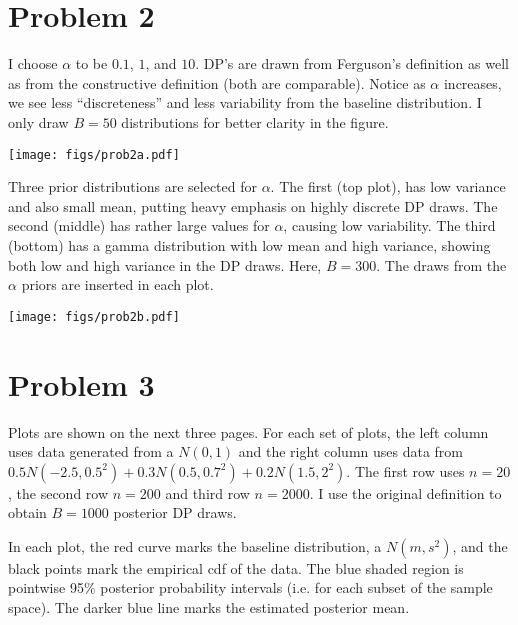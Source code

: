 \documentclass[12pt]{article}
\begin{document}
\newpage

\section*{Problem 2}

\noindent I choose $\alpha$ to be $0.1$, $1$, and $10$. DP's are drawn from Ferguson's definition as well as from the constructive definition (both are comparable). Notice as $\alpha$ increases, we see less ``discreteness'' and less variability from the baseline distribution. I only draw $B=50$ distributions for better clarity in the figure.

\begin{center}
\texttt{[image: figs/prob2a.pdf]}
\end{center}

\noindent Three prior distributions are selected for $\alpha$. The first (top plot), has low variance and also small mean, putting heavy emphasis on highly discrete DP draws. The second (middle) has rather large values for $\alpha$, causing low variability. The third (bottom) has a gamma distribution with low mean and high variance, showing both low and high variance in the DP draws. Here, $B=300$. The draws from the $\alpha$ priors are inserted in each plot.

\begin{center}
\texttt{[image: figs/prob2b.pdf]}
\end{center}

\newpage

\section*{Problem 3}

\noindent Plots are shown on the next three pages. For each set of plots, the left column uses data generated from a $N(0, 1)$ and the right column uses data from $0.5N(-2.5, 0.5^2) + 0.3N(0.5, 0.7^2) + 0.2N(1.5, 2^2)$. The first row uses $n=20$, the second row $n=200$ and third row $n=2000$. I use the original definition to obtain $B=1000$ posterior DP draws.
\bigskip

\noindent In each plot, the red curve marks the baseline distribution, a $N(m, s^2)$, and the black points mark the empirical cdf of the data. The blue shaded region is pointwise 95\% posterior probability intervals (i.e. for each subset of the sample space). The darker blue line marks the estimated posterior mean.
\bigskip
\end{document}
